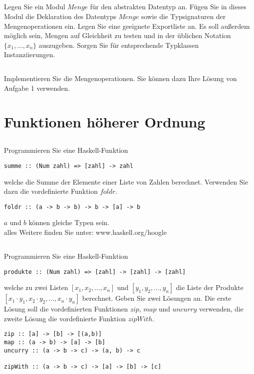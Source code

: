 \documentclass{article}
\begin{document}
\subsection{}
Legen Sie ein Modul $Menge$ für den abstrakten Datentyp
an. Fügen Sie in dieses Modul die Deklaration des Datentyps $Menge$ sowie die
Typsignaturen der Mengenoperationen ein. Legen Sie eine geeignete Exportliste
an. Es soll außerdem möglich sein, Mengen auf Gleichheit zu testen und in der
üblichen Notation $\{x_1, \ldots , x_n\}$ auszugeben. Sorgen Sie für entsprechende Typklassen Instanziierungen.

\subsection{}
Implementieren Sie die Mengenoperationen. Sie können dazu Ihre Lösung von
Aufgabe 1 verwenden.

\section{Funktionen höherer Ordnung}
\subsection{}
Programmieren Sie eine Haskell-Funktion 
\begin{lstlisting}
summe :: (Num zahl) => [zahl] -> zahl
\end{lstlisting}
welche die Summe der Elemente einer Liste von Zahlen berechnet. Verwenden Sie
dazu die vordefinierte Funktion $foldr$.\\
\begin{lstlisting}
foldr :: (a -> b -> b) -> b -> [a] -> b
\end{lstlisting}
$a$ und $b$ können gleiche Typen sein.\\
alles Weitere finden Sie unter: www.haskell.org/hoogle
\subsection{}
Programmieren Sie eine Haskell-Funktion 
\begin{lstlisting}
produkte :: (Num zahl) => [zahl] -> [zahl] -> [zahl]
\end{lstlisting}
welche zu zwei Listen $[x_1, x_2, \ldots , x_n]$ und $[y_1, y_2, \ldots, y_n]$ die Liste der Produkte
$[x_1 \cdot y_1, x_2 \cdot y_2, \ldots, x_n \cdot y_n]$
berechnet. Geben Sie zwei Lösungen an. Die erste Lösung soll die vordefinierten
Funktionen $zip$, $map$ und $uncurry$ verwenden, die zweite Lösung die vordefinierte
Funktion $zipWith$.
\begin{lstlisting}
zip :: [a] -> [b] -> [(a,b)]
map :: (a -> b) -> [a] -> [b]
uncurry :: (a -> b -> c) -> (a, b) -> c

zipWith :: (a -> b -> c) -> [a] -> [b] -> [c]
\end{lstlisting}
\end{document}
